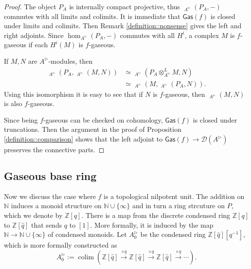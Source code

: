 \documentclass{article}
\theoremstyle{plain}
\theoremstyle{definition}
\theoremstyle{remark}
\DeclareMathOperator{\colim}{colim}
\DeclareMathOperator{\rhoms}{\underline{RHom}}
\newcommand{\dten}{\otimes ^{L}}
\newcommand{\huflag}{\triangleright}
\newcommand{\D}{\mathcal{D}}
\begin{document}
\begin{proof}
The object $ P _{A} $ is internally compact projective, thus $ \rhoms _{A ^{\huflag}}(P _{A}, -) $ commutes with all limits and colimits.
It is immediate that $ \mathsf{Gas}(f) $ is closed under limits and colimits.
Then Remark \ref{definition::nonsense} gives the left and right adjoints.
Since $ \hom _{A ^{\huflag}}(P _{A}, -) $ commutes with all $ H ^{i} $, a complex $ M $ is $ f $-gaseous if each $ H ^{i}(M) $ is $ f $-gaseous.

If $ M,N $ are $ A ^{\huflag} $-modules, then
\begin{align*}
\rhoms _{A ^{\huflag}}(P _{A}, \rhoms _{A ^{\huflag}}(M, N))
&\simeq \rhoms _{A ^{\huflag}}(P _{A}\dten _{A ^{\huflag}} M, N)\\
&\simeq \rhoms _{A ^{\huflag}}(M, \rhoms _{A ^{\huflag}}(P _{A}, N)).
\end{align*}
Using this isomorphism it is easy to see that if $ N $ is $ f $-gaseous,
then $ \rhoms _{A ^{\huflag}}(M, N) $ is also $ f $-gaseous.

Since being $ f $-gaseous can be checked on cohomology, $ \mathsf{Gas}(f) $ is closed under truncations.
Then the argument in the proof of Proposition \ref{definition::comparison} shows that
the left adjoint to $ \mathsf{Gas}(f)\to \D (A ^{\huflag}) $ preserves the connective parts.
\end{proof}

\subsection{Gaseous base ring}

Now we discuss the case where $ f $ is a topological nilpotent unit.
The addition on $ \mathbb{N} $ induces a monoid structure on $ \mathbb{N}\cup \{\infty\} $
and in turn a ring strcuture on $ P $,
which we denote by $ \mathbb{Z}[\hat{q}] $.
There is a map from the discrete condensed ring $ \mathbb{Z}[q] $ to $ \mathbb{Z}[\hat{q}] $
that sends $ q $ to $ [1] $.
More formally, it is induced by the map $ \mathbb{N}\to \mathbb{N}\cup \{\infty\} $ of condensed monoids.
Let $ A _{0}^{\huflag} $ be the condensed ring $ \mathbb{Z}[\hat{q}][q ^{-1}]$,
which is more formally constructed as
\begin{equation*}
A _{0}^{\huflag} := \colim (\mathbb{Z}[\hat{q}] \xrightarrow{\times q} \mathbb{Z}[\hat{q}]\xrightarrow{\times q} \mathbb{Z}[\hat{q}]\xrightarrow{\times q} \cdots   ).
\end{equation*}
\end{document}
